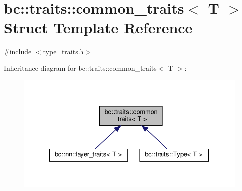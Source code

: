\hypertarget{structbc_1_1traits_1_1common__traits}{}\section{bc\+:\+:traits\+:\+:common\+\_\+traits$<$ T $>$ Struct Template Reference}
\label{structbc_1_1traits_1_1common__traits}


{\ttfamily \#include $<$type\+\_\+traits.\+h$>$}



Inheritance diagram for bc\+:\+:traits\+:\+:common\+\_\+traits$<$ T $>$\+:\nopagebreak
\begin{figure}[H]
\begin{center}
\leavevmode
\includegraphics[width=328pt]{structbc_1_1traits_1_1common__traits__inherit__graph}
\end{center}
\end{figure}
